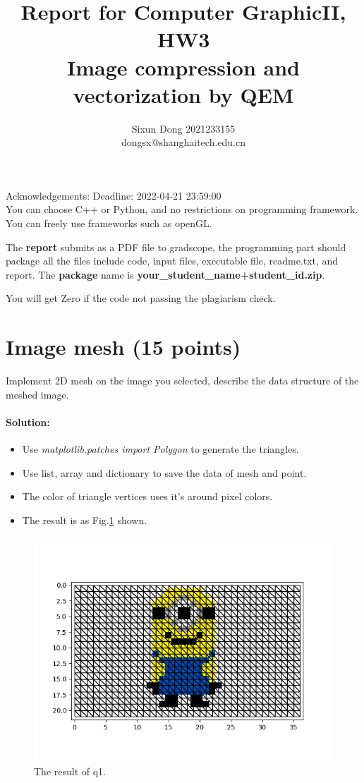 \documentclass[]{article}
\title{Report for Computer GraphicII, HW3 \\ Image compression and vectorization by QEM}
\author{Sixun Dong 2021233155 \\ {dongsx@shanghaitech.edu.cn}}
\begin{document}
\maketitle
Acknowledgements:
Deadline: 2022-04-21 23:59:00
\\

You can choose C++ or Python, and no restrictions on programming framework. You can freely use frameworks such as openGL.

The \textbf{report} submits as a PDF file to gradscope, the programming part should package all the files include code, input files, executable file, readme.txt, and report. The \textbf{package} name is  \textbf{your\_student\_name+student\_id.zip}.

You will get Zero if the code not passing the plagiarism check.
\newpage
\section{Image mesh (15 points)}
Implement 2D mesh on the image you selected, describe the data structure of the meshed image.

\paragraph{\color{red}Solution:}
\begin{itemize}
    \item[(1)] Use \textit{matplotlib.patches import Polygon} to generate the triangles.
    \item[(2)] Use list, array and dictionary to save the data of mesh and point.
    \item[(3)] The color of triangle vertices uses it's around pixel colors.
    \item[(4)] The result is as Fig.\ref{fig:q1} shown. 
\end{itemize}
\begin{figure}[ht]
    \centering 
    \includegraphics[width=1\columnwidth]{q1.png} 
    \caption{The result of q1.}
    \label{fig:q1} 
\end{figure}
\end{document}
